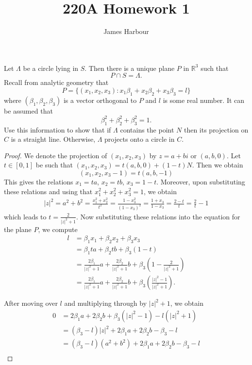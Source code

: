\documentclass[12pt]{article}
\title{220A Homework 1}
\author{James Harbour}
\begin{document}
\maketitle


\begin{homeworkProblem}
  Let $\Lambda$ be a circle lying in $S$. Then there is a unique plane $P$ in $\mathbb{R}^3$ such that 
\[ P \cap S = \Lambda. \]
Recall from analytic geometry that
\[
P = \{ (x_1, x_2, x_3) : x_1 \beta_1 + x_2 \beta_2 + x_3 \beta_3 = l \}
\]
where $(\beta_1, \beta_2, \beta_3)$ is a vector orthogonal to $P$ and $l$ is some real number. It can be assumed that 
\[
\beta_1^2 + \beta_2^2 + \beta_3^2 = 1.
\]
Use this information to show that if $\Lambda$ contains the point $N$ then its projection on $C$ is a straight line. Otherwise, $\Lambda$ projects onto a circle in $C$.

\begin{proof}
  We denote the projection of $ (x_{1},x_{2},x_{3}) $ by $ z= a+bi $ or $ (a,b,0) $.
  Let $ t\in[0,1] $ be such that $ (x_{1},x_{2},x_{3}) = t(a,b,0)+(1-t)N $. Then we obtain
  \[
    (x_{1},x_{2},x_{3}-1) = t(a,b,-1)
  \]
  This gives the relations $ x_{1}=ta $, $ x_{2}=tb $, $ x_{3}=1-t $. Moreover, upon substituting these relations and using that $ x_{1}^{2}+x_{2}^{2}+x_{3}^{2}=1 $, we obtain
  \begin{align*}
   |z|^{2} = a^{2}+b^{2} = \frac{x_{1}^{2}+x_{2}^{2}}{t^{2}} = \frac{1-x_{3}^{2}}{(1-x_{3})^{2}} = \frac{1+x_{3}}{1-x_{3}} = \frac{2-t}{t} =  \frac{2}{t} -1
  \end{align*}
  which leads to $ t = \frac{2}{|z|^{2}+1} $. Now substituting these relations into the equation for the plane $ P $, we compute
  \begin{align*}
    l &= \beta_{1}x_{1}+\beta_{2}x_{2}+\beta_{3}x_{3}\\
    &=\beta_{1}ta+\beta_{2}tb+\beta_{3}(1-t)\\
    &=\frac{2\beta_{1}}{|z|^{2}+1}a+\frac{2\beta_{2}}{|z|^{2}+1}b+\beta_{3}\left(1-\frac{2}{|z|^{2}+1}\right)\\
    &=\frac{2\beta_{1}}{|z|^{2}+1}a+\frac{2\beta_{2}}{|z|^{2}+1}b+\beta_{3}\left(\frac{|z|^{2}-1}{|z|^{2}+1}\right).
  \end{align*}

  After moving over $ l $ and multiplying through by $ |z|^{2}+1 $, we obtain 
  \begin{align*}
    0&= 2\beta_{1}a + 2\beta_{2}b+\beta_{3}(|z|^{2}-1)-l(|z|^{2}+1)\\
    &=(\beta_{3}-l)|z|^{2}+ 2\beta_{1}a + 2\beta_{2}b - \beta_{3}-l\\
    &=(\beta_{3}-l)(a^{2}+b^{2})+ 2\beta_{1}a + 2\beta_{2}b - \beta_{3}-l\\
  \end{align*}


\end{proof}
\end{homeworkProblem}
\end{document}
